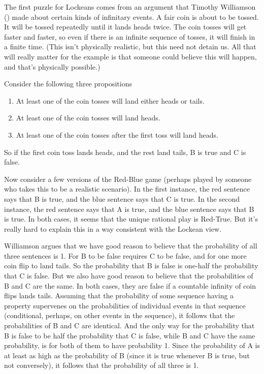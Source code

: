 \documentclass[
  12pt,
  letterpaper,
]{scrbook}
\providecommand{\tightlist}{%
  \setlength{\itemsep}{0pt}\setlength{\parskip}{0pt}}\usepackage{longtable,booktabs,array}
\begin{document}
The first puzzle for Lockeans comes from an argument that Timothy
Williamson () made about certain
kinds of infinitary events. A fair coin is about to be tossed. It will
be tossed repeatedly until it lands heads twice. The coin tosses will
get faster and faster, so even if there is an infinite sequence of
tosses, it will finish in a finite time. (This isn't physically
realistic, but this need not detain us. All that will really matter for
the example is that someone could believe this will happen, and that's
physically possible.)

Consider the following three propositions

\begin{enumerate}
\def\labelenumi{\Alph{enumi}.}
\tightlist
\item
  At least one of the coin tosses will land either heads or tails.
\item
  At least one of the coin tosses will land heads.
\item
  At least one of the coin tosses after the first toss will land heads.
\end{enumerate}

So if the first coin toss lands heads, and the rest land tails, B is
true and C is false.

Now consider a few versions of the Red-Blue game (perhaps played by
someone who takes this to be a realistic scenario). In the first
instance, the red sentence says that B is true, and the blue sentence
says that C is true. In the second instance, the red sentence says that
A is true, and the blue sentence says that B is true. In both cases, it
seems that the unique rational play is Red-True. But it's really hard to
explain this in a way consistent with the Lockean view.

Williamson argues that we have good reason to believe that the
probability of all three sentences is 1. For B to be false requires C to
be false, and for one more coin flip to land tails. So the probability
that B is false is one-half the probability that C is false. But we also
have good reason to believe that the probabilities of B and C are the
same. In both cases, they are false if a countable infinity of coin
flips lands tails. Assuming that the probability of some sequence having
a property supervenes on the probabilities of individual events in that
sequence (conditional, perhaps, on other events in the sequence), it
follows that the probabilities of B and C are identical. And the only
way for the probability that B is false to be half the probability that
C is false, while B and C have the same probability, is for both of them
to have probability 1. Since the probability of A is at least as high as
the probability of B (since it is true whenever B is true, but not
conversely), it follows that the probability of all three is 1.
\end{document}
